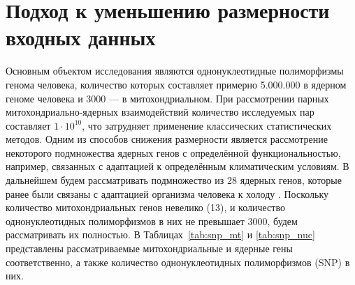 \section{Подход к уменьшению размерности входных данных}\label{sec:ch3/sec2}

Основным объектом исследования являются однонуклеотидные полиморфизмы генома человека, количество которых составляет примерно 5.000.000 в ядерном геноме человека и 3000 --- в митохондриальном. При рассмотрении парных митохондриально-ядерных взаимодействий количество исследуемых пар составляет $1 \cdot 10^{10}$, что затрудняет применение классических статистических методов. Одним из способов снижения размерности является рассмотрение некоторого подмножества ядерных генов с определённой функциональностью, например, связанных с адаптацией к определённым климатическим условиям. В дальнейшем будем рассматривать подмножество из 28 ядерных генов, которые ранее были связаны с адаптацией организма человека к холоду \autocite{Sazzini2014}. Поскольку количество митохондриальных генов невелико (13), и количество однонуклеотидных полиморфизмов в них не превышает 3000, будем рассматривать их полностью. В Таблицах~\ref{tab:snp_mt} и \ref{tab:snp_nuc} представлены рассматриваемые митохондриальные и ядерные гены соответственно, а также количество однонуклеотидных полиморфизмов (SNP) в них.

